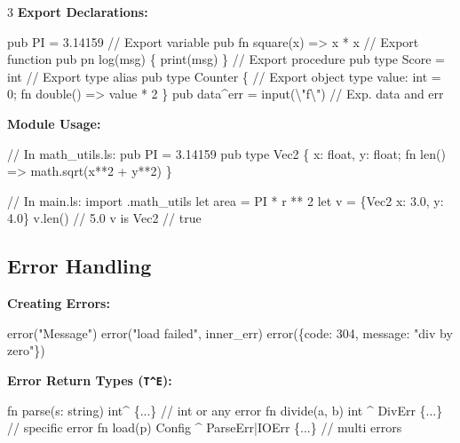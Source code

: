 \documentclass[8pt,landscape,a4paper,oneside]{article}
\newenvironment{Shaded}{%
  \begin{snugshade}%
  \vspace{0.4\baselineskip}%
  \fontsize{9}{10}\selectfont%
  \setlength{\parskip}{0pt}%
  \setlength{\topsep}{0pt}%
  \setlength{\partopsep}{0pt}%
}{%
  \vspace{0.01\baselineskip}%
  \end{snugshade}%
}
\newcommand{\NormalTok}[1]{#1}
\begin{document}
\begin{multicols*}{3}
\textbf{Export Declarations:}

\begin{Shaded}
\begin{Highlighting}[]
\NormalTok{pub PI = 3.14159               // Export variable}
\NormalTok{pub fn square(x) =\textgreater{} x * x      // Export function}
\NormalTok{pub pn log(msg) \{ print(msg) \} // Export procedure}
\NormalTok{pub type Score = int           // Export type alias}
\NormalTok{pub type Counter \{             // Export object type}
\NormalTok{    value: int = 0;}
\NormalTok{    fn double() =\textgreater{} value * 2}
\NormalTok{\}}
\NormalTok{pub data\^{}err = input(\textbackslash{}"f\textbackslash{}")    // Exp. data and err}
\end{Highlighting}
\end{Shaded}

\textbf{Module Usage:}

\begin{Shaded}
\begin{Highlighting}[]
\NormalTok{// In math\_utils.ls:}
\NormalTok{pub PI = 3.14159}
\NormalTok{pub type Vec2 \{ x: float, y: float; fn len() =\textgreater{} }
\NormalTok{    math.sqrt(x**2 + y**2) \}}

\NormalTok{// In main.ls:}
\NormalTok{import .math\_utils}
\NormalTok{let area = PI * r ** 2}
\NormalTok{let v = \{Vec2 x: 3.0, y: 4.0\}}
\NormalTok{v.len()        // 5.0}
\NormalTok{v is Vec2      // true}
\end{Highlighting}
\end{Shaded}

\subsection{Error Handling}\label{error-handling}

\textbf{Creating Errors:}

\begin{Shaded}
\begin{Highlighting}[]
\NormalTok{error("Message")    error("load failed", inner\_err)}
\NormalTok{error(\{code: 304, message: "div by zero"\})}
\end{Highlighting}
\end{Shaded}

\textbf{Error Return Types (\texttt{T\^{}E}):}

\begin{Shaded}
\begin{Highlighting}[]
\NormalTok{fn parse(s: string) int\^{} \{...\}   // int or any error}
\NormalTok{fn divide(a, b) int \^{} DivErr \{...\}    // specific error}
\NormalTok{fn load(p) Config \^{} ParseErr|IOErr \{...\} // multi errors}
\end{Highlighting}
\end{Shaded}


\end{multicols*}
\end{document}
